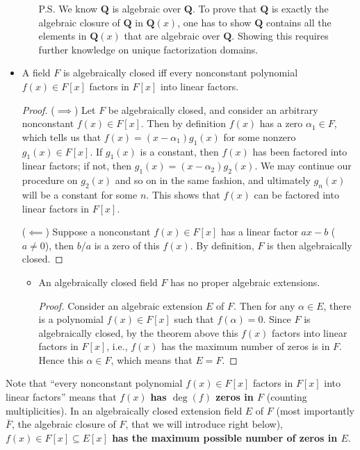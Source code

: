 \documentclass[11pt]{article}
\newcommand{\Q}{\mathbf{Q}}
\newcommand{\clos}[1]{\overline{#1}}
\begin{document}
\begin{itemize}
\begin{itemize}
        P.S. We know $\Q$ is algebraic over $\Q$. To prove that $\Q$ is exactly the algebraic closure of $\Q$ in $\Q(x)$, one has to show $\Q$ contains all the elements in $\Q(x)$ that are algebraic over $\Q$. Showing this requires further knowledge on unique factorization domains.
    \end{itemize}
    \item A field $F$ is algebraically closed iff every nonconstant polynomial $f(x) \in F[x]$ factors in $F[x]$ into linear factors.
    \begin{proof}
        ($\implies$) Let $F$ be algebraically closed, and consider an arbitrary nonconstant $f(x) \in F[x]$. Then by definition $f(x)$ has a zero $\alpha_1 \in F$, which tells us that $f(x) = (x-\alpha_1) g_1(x)$ for some nonzero $g_1(x) \in F[x]$. If $g_1(x)$ is a constant, then $f(x)$ has been factored into linear factors; if not, then $g_1(x) = (x - \alpha_2) g_2(x)$. We may continue our procedure on $g_2(x)$ and so on in the same fashion, and ultimately $g_n(x)$ will be a constant for some $n$. This shows that $f(x)$ can be factored into linear factors in $F[x]$.

        ($\impliedby$) Suppose a nonconstant $f(x) \in F[x]$ has a linear factor $ax-b$ ($a \neq 0$), then $b/a$ is a zero of this $f(x)$. By definition, $F$ is then algebraically closed.
    \end{proof}
    \begin{itemize}
        \item An algebraically closed field $F$ has no proper algebraic extensions.
        \begin{proof}
            Consider an algebraic extension $E$ of $F$. Then for any $\alpha \in E$, there is a polynomial $f(x) \in F[x]$ such that $f(\alpha) = 0$. Since $F$ is algebraically closed, by the theorem above this $f(x)$ factors into linear factors in $F[x]$, i.e., $f(x)$ has the maximum number of zeros is in $F$. Hence this $\alpha \in F$, which means that $E = F$.
        \end{proof}
    \end{itemize}
\end{itemize}
\begin{framed}
    Note that ``every nonconstant polynomial $f(x) \in F[x]$ factors in $F[x]$ into linear factors'' means that $f(x)$ \textbf{has $\deg(f)$ zeros in $F$} (counting multiplicities). In an algebraically closed extension field $E$ of $F$ (most importantly $\clos{F}$, the algebraic closure of $F$, that we will introduce right below), \textbf{$f(x) \in F[x] \subseteq E[x]$ has the maximum possible number of zeros in $E$}.
\end{framed}
\end{document}
